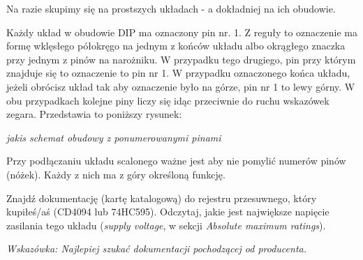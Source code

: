 \documentclass{pdfBooklets}
\begin{document}
Na razie skupimy się na prostszych układach - a dokładniej na ich obudowie.

Każdy układ w obudowie DIP ma oznaczony pin nr. 1. Z reguły to oznaczenie ma formę wklęsłego półokręgo na jednym z końców układu albo
okrągłego znaczka przy jednym z pinów na narożniku. W przypadku tego drugiego, pin przy którym znajduje się to oznaczenie to pin nr 1.
W przypadku oznaczonego końca układu, jeżeli obrócisz układ tak aby oznaczenie było na górze, pin nr 1 to lewy górny. W obu przypadkach kolejne piny
liczy się idąc przeciwnie do ruchu wskazówek zegara. Przedstawia to poniższy rysunek:

\textit{jakis schemat obudowy z ponumerowanymi pinami}

Przy podłączaniu układu scalonego ważne jest aby nie pomylić numerów pinów (nóżek). Każdy z nich ma z góry określoną funkcję.


\begin{Zadanie}{}{}
  Znajdź dokumentację (kartę katalogową) do rejestru przesuwnego, który kupiłeś/aś (CD4094 lub 74HC595).
  Odczytaj, jakie jest największe napięcie zasilania tego układu (\textit{supply voltage}, w sekcji
  \textit{Absolute maximum ratings}).

  \textit{Wskazówka: Najlepiej szukać dokumentacji pochodzącej od producenta.}
\end{Zadanie}



\end{document}
